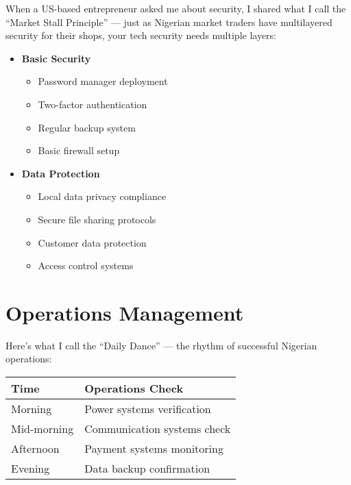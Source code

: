When a US-based entrepreneur asked me about security, I shared what I call the ``Market Stall Principle'' --- just as Nigerian market traders have multilayered security for their shops, your tech security needs multiple layers:

\begin{tcolorbox}[colback=white,colframe=primarydark,title=\textbf{Security Framework}]
\begin{itemize}
    \item \textbf{Basic Security}
    \begin{itemize}
        \item Password manager deployment
        \item Two-factor authentication
        \item Regular backup system
        \item Basic firewall setup
    \end{itemize}

    \item \textbf{Data Protection}
    \begin{itemize}
        \item Local data privacy compliance
        \item Secure file sharing protocols
        \item Customer data protection
        \item Access control systems
    \end{itemize}
\end{itemize}
\end{tcolorbox}

\section{Operations Management}\label{sec:operations-management}

Here's what I call the ``Daily Dance'' --- the rhythm of successful Nigerian operations:

\begin{center}
\begin{tabularx}{\textwidth}{>{\raggedright\arraybackslash}X >{\raggedright\arraybackslash}X}
    \toprule
    \textbf{Time} & \textbf{Operations Check} \\
    \midrule
    Morning & Power systems verification \\
    Mid-morning & Communication systems check \\
    Afternoon & Payment systems monitoring \\
    Evening & Data backup confirmation \\
    \bottomrule
\end{tabularx}
\end{center}

